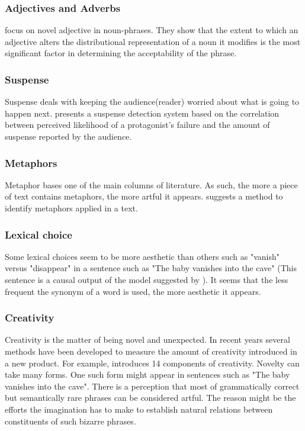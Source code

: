 \documentclass{article}
\begin{document}
			\subsubsection{Adjectives and Adverbs}
			\citet{vecchi-2016-spicy-adjectives-and-nominal-donkeys-capturing-semantic-deviance-using-compositionality-in-distributional-spaces} focus on novel adjective in noun-phrases. They show that the extent to which an adjective alters the distributional representation of a noun it modifies is the most significant factor in determining the acceptability of the phrase.
			
			\subsubsection{Suspense}
			Suspense deals with keeping the audience(reader) worried about what is going to happen next. \citet{oneill-2011-toward-a-computational-framework-of-suspense-and-dramatic-arc} presents a suspense detection system based on the correlation between perceived likelihood of a protagonist’s failure and the amount of suspense reported by the audience.
			
			\subsubsection{Metaphors}\label{sec:metaphor}
			Metaphor bases one of the main columns of literature. As such, the more a piece of text contains metaphors, the more artful it appears.  \citet{mao-2018-word-embedding-and-wordnet-based-metaphor-identification-and-interpretation} suggests a method to identify metaphors applied in a text.    
			
			\subsubsection{Lexical choice} 
			Some lexical choices seem to be more aesthetic than others such as "vanish" versus "disappear" in a sentence such as "The baby vanishes into the cave" (This sentence is a causal output of the model suggested by \citet{mcintyre-2009-learning-to-tell-tales-a-data-driven-approach-to-story-generation}). It seems that the less frequent the synonym of a word is used, the more aesthetic it appears. 
			
			\subsubsection{Creativity}
			Creativity is the matter of being novel and unexpected. In recent years several methods have been developed to measure the amount of creativity introduced in a new product. For example, \citet{jordanous-2012-a-standardised-procedure-for-evaluating-creative-systems-computational-creativity-evaluation-based-on-what-it-is-to-be-creative} introduces 14 components of creativity. 
			Novelty can take many forms. One such form might appear in sentences such as "The baby vanishes into the cave". There is a perception that most of grammatically correct but semantically rare phrases can be considered artful. The reason might be the efforts the imagination has to make to establish natural relations between constituents of such bizarre phrases.
			
\end{document}
